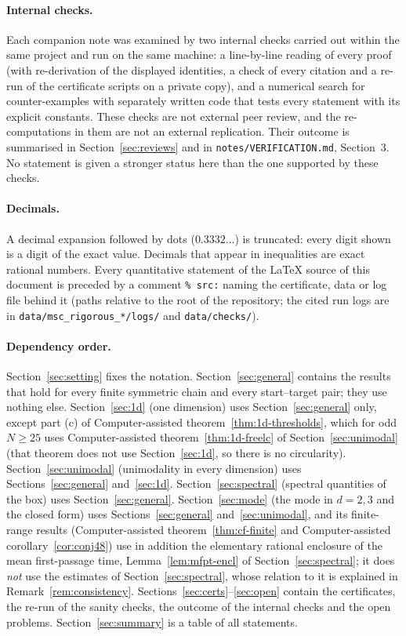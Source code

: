 \documentclass[10pt,a4paper]{article}
\theoremstyle{plain}
\theoremstyle{definition}
\begin{document}
\paragraph{Internal checks.} Each companion note was examined by two internal checks carried out within the same project and run on the same machine: a line-by-line reading of every proof (with re-derivation of the displayed identities, a check of every citation and a re-run of the certificate scripts on a private copy), and a numerical search for counter-examples with separately written code that tests every statement with its explicit constants. These checks are not external peer review, and the re-computations in them are not an external replication. Their outcome is summarised in Section~\ref{sec:reviews} and in \texttt{notes/VERIFICATION.md}, Section~3. No statement is given a stronger status here than the one supported by these checks.

\paragraph{Decimals.} A decimal expansion followed by dots ($0.3332\ldots$) is truncated: every digit shown is a digit of the exact value. Decimals that appear in inequalities are exact rational numbers. Every quantitative statement of the \LaTeX{} source of this document is preceded by a comment \texttt{\% src:} naming the certificate, data or log file behind it (paths relative to the root of the repository; the cited run logs are in \texttt{data/msc\_rigorous\_*/logs/} and \texttt{data/checks/}).

\paragraph{Dependency order.} Section~\ref{sec:setting} fixes the notation. Section~\ref{sec:general} contains the results that hold for every finite symmetric chain and every start--target pair; they use nothing else. Section~\ref{sec:1d} (one dimension) uses Section~\ref{sec:general} only, except part (c) of Computer-assisted theorem~\ref{thm:1d-thresholds}, which for odd $N\ge25$ uses Computer-assisted theorem~\ref{thm:1d-freelc} of Section~\ref{sec:unimodal} (that theorem does not use Section~\ref{sec:1d}, so there is no circularity). Section~\ref{sec:unimodal} (unimodality in every dimension) uses Sections~\ref{sec:general} and~\ref{sec:1d}. Section~\ref{sec:spectral} (spectral quantities of the box) uses Section~\ref{sec:general}. Section~\ref{sec:mode} (the mode in $d=2,3$ and the closed form) uses Sections~\ref{sec:general} and~\ref{sec:unimodal}, and its finite-range results (Computer-assisted theorem~\ref{thm:cf-finite} and Computer-assisted corollary~\ref{cor:conj48}) use in addition the elementary rational enclosure of the mean first-passage time, Lemma~\ref{lem:mfpt-encl} of Section~\ref{sec:spectral}; it does \emph{not} use the estimates of Section~\ref{sec:spectral}, whose relation to it is explained in Remark~\ref{rem:consistency}. Sections~\ref{sec:certs}--\ref{sec:open} contain the certificates, the re-run of the sanity checks, the outcome of the internal checks and the open problems. Section~\ref{sec:summary} is a table of all statements.
\end{document}
